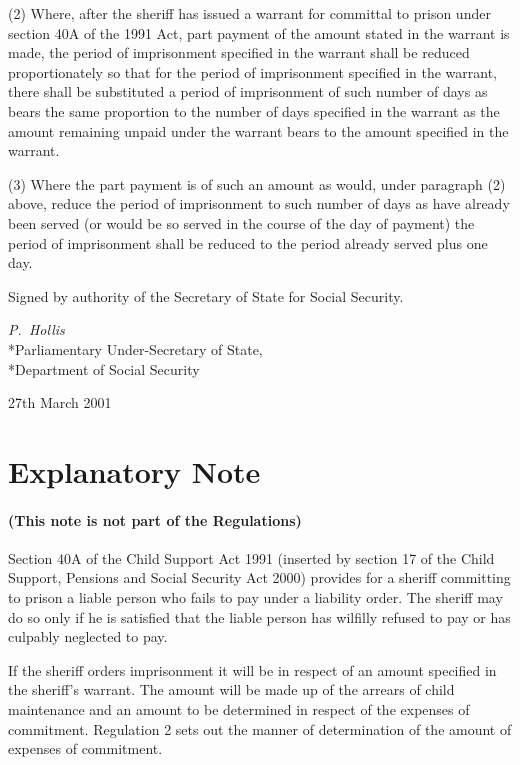 \documentclass[12pt,a4paper]{article}
\begin{document}
(2) Where, after the sheriff has issued a warrant for committal to prison under section 40A of the 1991 Act, part payment of the amount stated in the warrant is made, the period of imprisonment specified in the warrant shall be reduced proportionately so that for the period of imprisonment specified in the warrant, there shall be substituted a period of imprisonment of such number of days as bears the same proportion to the number of days specified in the warrant as the amount remaining unpaid under the warrant bears to the amount specified in the warrant.

(3) Where the part payment is of such an amount as would, under paragraph (2) above, reduce the period of imprisonment to such number of days as have already been served (or would be so served in the course of the day of payment) the period of imprisonment shall be reduced to the period already served plus one day. 

\bigskip

Signed 
by authority of the Secretary of State for Social Security.

{\raggedleft
\emph{P.~Hollis}\\*Parliamentary Under-Secretary of State,\\*Department of Social Security

}

27th March 2001

\small

\part{Explanatory Note}

\renewcommand\parthead{— Explanatory Note}

\subsection*{(This note is not part of the Regulations)}

Section 40A of the Child Support Act 1991 (inserted by section 17 of the Child Support, Pensions and Social Security Act 2000) provides for a sheriff committing to prison a liable person who fails to pay under a liability order. The sheriff may do so only if he is satisfied that the liable person has wilfilly refused to pay or has culpably neglected to pay.

If the sheriff orders imprisonment it will be in respect of an amount specified in the sheriff’s warrant. The amount will be made up of the arrears of child maintenance and an amount to be determined in respect of the expenses of commitment. Regulation 2 sets out the manner of determination of the amount of expenses of commitment.
\end{document}
